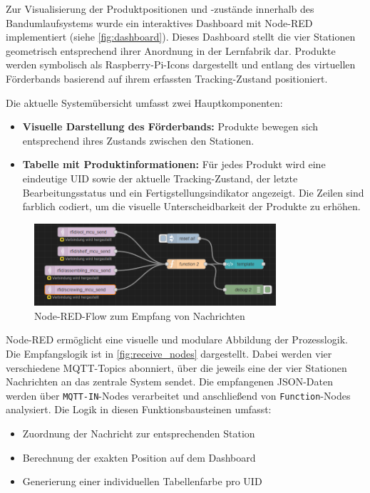 Zur Visualisierung der Produktpositionen und -zustände innerhalb des Bandumlaufsystems wurde ein interaktives Dashboard mit Node-RED implementiert (siehe \autoref{fig:dashboard}). Dieses Dashboard stellt die vier Stationen geometrisch entsprechend ihrer Anordnung in der Lernfabrik dar. Produkte werden symbolisch als Raspberry-Pi-Icons dargestellt und entlang des virtuellen Förderbands basierend auf ihrem erfassten Tracking-Zustand positioniert.

Die aktuelle Systemübersicht umfasst zwei Hauptkomponenten:
\begin{itemize}
	\item \textbf{Visuelle Darstellung des Förderbands:} Produkte bewegen sich entsprechend ihres Zustands zwischen den Stationen.
	\item \textbf{Tabelle mit Produktinformationen:} Für jedes Produkt wird eine eindeutige UID sowie der aktuelle Tracking-Zustand, der letzte Bearbeitungsstatus und ein Fertigstellungsindikator angezeigt. Die Zeilen sind farblich codiert, um die visuelle Unterscheidbarkeit der Produkte zu erhöhen.
\end{itemize}

\begin{figure}[H]
	\centering
	\includegraphics[width=0.8\textwidth]{images/node-red-flow-receive.png}
	\caption{Node-RED-Flow zum Empfang von Nachrichten}
	\label{fig:receive_nodes}
\end{figure}

Node-RED ermöglicht eine visuelle und modulare Abbildung der Prozesslogik. Die Empfangslogik ist in \autoref{fig:receive_nodes} dargestellt. Dabei werden vier verschiedene MQTT-Topics abonniert, über die jeweils eine der vier Stationen Nachrichten an das zentrale System sendet. Die empfangenen JSON-Daten werden über \texttt{MQTT-IN}-Nodes verarbeitet und anschließend von \texttt{Function}-Nodes analysiert. Die Logik in diesen Funktionsbausteinen umfasst:
\begin{itemize}
	\item Zuordnung der Nachricht zur entsprechenden Station
	\item Berechnung der exakten Position auf dem Dashboard
	\item Generierung einer individuellen Tabellenfarbe pro UID
\end{itemize}


